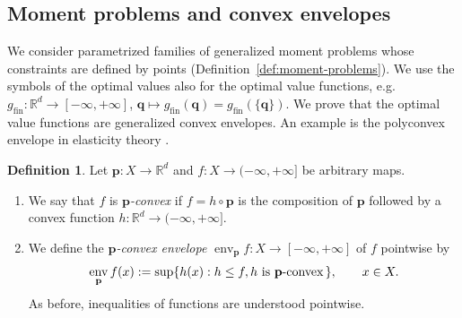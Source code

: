 \documentclass[a4paper,11pt,reqno]{amsart}
\numberwithin{equation}{section}
\theoremstyle{plain}
\theoremstyle{definition}
\newtheorem{definition}[theorem]{Definition}
\newcommand{\bp}{\mathbf{p}}
\newcommand{\bq}{\mathbf{q}}
\newcommand{\R}{\mathbb{R}} %
\DeclareMathOperator\env{env} %
\newcommand\fint{\mathrm{fin}}
\begin{document}
\subsection{Moment problems and convex envelopes}
\label{sec:Dacorogna-MP}
%
We consider parametrized families of generalized moment problems whose constraints are 
defined by points (Definition~\ref{def:moment-problems}). We use the symbols of the 
optimal values also for the optimal value functions, e.g.\
$g_\fint\colon\R^d\to[-\infty,+\infty]$, $\bq\mapsto g_\fint(\bq)=g_\fint(\{\bq\})$. 
We prove that the optimal value functions are generalized convex envelopes. An example 
is the polyconvex envelope in elasticity theory \cite{ball76,dacorogna08}.
\par
%
\begin{definition}
Let $\bp\colon X\to\R^d$ and $f\colon X\to(-\infty,+\infty]$ be arbitrary maps.
\begin{enumerate}
\item
We say that $f$ is \emph{$\bp$-convex} if $f=h\circ\bp$ is the composition of $\bp$ 
followed by  a convex function $h\colon\R^d\to(-\infty,+\infty]$.
%
\item
We define the \emph{$\bp$-convex envelope} $\env_\bp f\colon X\to[-\infty,+\infty]$
of $f$ pointwise by 
\[
\env_\bp f(x) := \sup\{h(x): h\leq f, \text{$h$ is $\bp$-convex\,}\},
\qquad x\in X.
\]
As before, inequalities of functions are understood pointwise.
\end{enumerate}
\end{definition}
%
\end{document}
